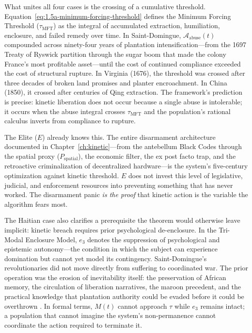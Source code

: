 What unites all four cases is the crossing of a cumulative threshold. Equation~\ref{eq:1.5a-minimum-forcing-threshold} defines the Minimum Forcing Threshold ($\tau_{\text{MFT}}$) as the integral of accumulated extraction, humiliation, enclosure, and failed remedy over time. In Saint-Domingue, $\mathcal{A}_{\text{abuse}}(t)$ compounded across ninety-four years of plantation intensification---from the 1697 Treaty of Ryswick partition through the sugar boom that made the colony France's most profitable asset---until the cost of continued compliance exceeded the cost of structural rupture. In Virginia (1676), the threshold was crossed after three decades of broken land promises and planter encroachment. In China (1850), it crossed after centuries of Qing extraction. The framework's prediction is precise: kinetic liberation does not occur because a single abuse is intolerable; it occurs when the abuse integral crosses $\tau_{\text{MFT}}$ and the population's rational calculus inverts from compliance to rupture.

The Elite ($E$) already knows this. The entire disarmament architecture documented in Chapter~\ref{ch:kinetic}---from the antebellum Black Codes through the spatial proxy ($P_{\text{spatial}}$), the economic filter, the ex post facto trap, and the retroactive criminalization of decentralized hardware---is the system's five-century optimization against kinetic threshold. $E$ does not invest this level of legislative, judicial, and enforcement resources into preventing something that has never worked. The disarmament panic \textit{is the proof} that kinetic action is the variable the algorithm fears most.

The Haitian case also clarifies a prerequisite the theorem would otherwise leave implicit: kinetic breach requires prior psychological de-enclosure. In the Tri-Modal Enclosure Model, $e_3$ denotes the suppression of psychological and epistemic autonomy---the condition in which the subject can experience domination but cannot yet model its contingency. Saint-Domingue's revolutionaries did not move directly from suffering to coordinated war. The prior operation was the erosion of inevitability itself: the preservation of African memory, the circulation of liberation narratives, the maroon precedent, and the practical knowledge that plantation authority could be evaded before it could be overthrown \cite{james_black_jacobins,dubois_avengers_new_world}. In formal terms, $M(t)$ cannot approach $\tau$ while $e_3$ remains intact; a population that cannot imagine the system's non-permanence cannot coordinate the action required to terminate it.


